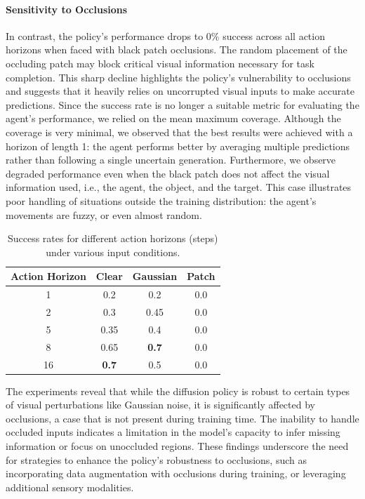 \paragraph{Sensitivity to Occlusions}
In contrast, the policy's performance drops to 0\% success across all action horizons when faced with black patch occlusions.
The random placement of the occluding patch may block critical visual information necessary for task completion.
This sharp decline highlights the policy's vulnerability to occlusions and suggests that it heavily relies on uncorrupted visual inputs to make accurate predictions.
Since the success rate is no longer a suitable metric for evaluating the agent's performance,
we relied on the mean maximum coverage. Although the coverage is very minimal, we observed that the best
results were achieved with a horizon of length 1: the agent performs better by averaging multiple
predictions rather than following a single uncertain generation.
Furthermore, we observe degraded performance even when the black patch does not affect the visual
information used, i.e., the agent, the object, and the target. This case illustrates poor handling
of situations outside the training distribution: the agent's movements are fuzzy, or even almost random.

\begin{table}[!htb]
    \centering
    \caption{Success rates for different action horizons (steps) under various input conditions.}
    \label{tab:success_rates}
    \begin{tabular}{c|c|c|c}
    \hline
    \textbf{Action Horizon} & \textbf{Clear} & \textbf{Gaussian} & \textbf{Patch} \\
    \hline
    1 & 0.2 & 0.2 & 0.0 \\
    2 & 0.3 & 0.45 & 0.0 \\
    5 & 0.35 & 0.4 & 0.0 \\
    8 & 0.65 & \textbf{0.7} & 0.0 \\
    16 & \textbf{0.7} & 0.5 & 0.0 \\
    \hline
    \end{tabular}
\end{table}

The experiments reveal that while the diffusion policy is robust to certain types of visual perturbations like Gaussian noise, it is significantly affected by occlusions, a case that is not present during training time.
The inability to handle occluded inputs indicates a limitation in the model's capacity to infer missing information or focus on unoccluded regions.
These findings underscore the need for strategies to enhance the policy's robustness to occlusions, such as incorporating data augmentation with occlusions during training, or leveraging additional sensory modalities.

